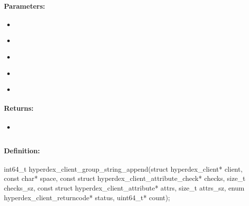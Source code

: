 \paragraph{Parameters:}
\begin{itemize}[noitemsep]
\item {}\\

\item {}\\

\item {}\\

\item {}\\

\item {}\\

\end{itemize}

\paragraph{Returns:}
\begin{itemize}[noitemsep]
\item {}\\

\end{itemize}

\pagebreak
\subsection{}
\label{api:c:group_string_append}


\paragraph{Definition:}
\begin{ccode}
int64_t hyperdex_client_group_string_append(struct hyperdex_client* client,
        const char* space,
        const struct hyperdex_client_attribute_check* checks, size_t checks_sz,
        const struct hyperdex_client_attribute* attrs, size_t attrs_sz,
        enum hyperdex_client_returncode* status,
        uint64_t* count);
\end{ccode}

